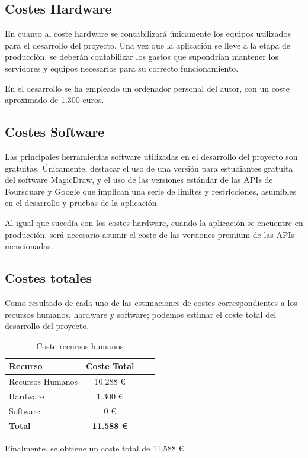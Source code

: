 \subsection{Costes Hardware}
En cuanto al coste hardware se contabilizará únicamente los equipos utilizados para el desarrollo del proyecto. Una vez que la aplicación se lleve a la etapa de producción, se deberán contabilizar los gastos que supondrían mantener los servidores y equipos necesarios para su correcto funcionamiento.

En el desarrollo se ha empleado un ordenador personal del autor, con un coste aproximado de 1.300 euros.


\subsection{Costes Software}
Las principales herramientas software utilizadas en el desarrollo del proyecto son gratuitas. Únicamente, destacar el uso de una versión para estudiantes gratuita del software MagicDraw, y el uso de las versiones estándar de las APIs de Foursquare y Google que implican una serie de límites y restricciones, asumibles en el desarrollo y pruebas de la aplicación. 

Al igual que sucedía con los costes hardware, cuando la aplicación se encuentre en producción, será necesario asumir el coste de las versiones premium de las APIs mencionadas.


\subsection{Costes totales}
Como resultado de cada uno de las estimaciones de costes correspondientes a los recursos humanos, hardware y software; podemos estimar el coste total del desarrollo del proyecto.

\begin{table}[H]
\centering
\begin{tabular}{|l|c|c|c|}
\hline
\textbf{Recurso} & \textbf{Coste Total} \\ \hline
Recursos Humanos &  10.288 € \\ \hline
Hardware & 1.300 €  \\ \hline
Software & 0 €  \\ \hline
\textbf{Total} & \textbf{11.588 €} \\ \hline
\end{tabular}
\caption{Coste recursos humanos}
\end{table}

Finalmente, se obtiene un coste total de 11.588 €.
